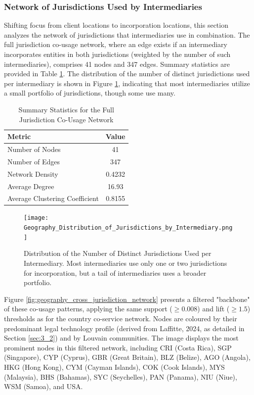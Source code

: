 \subsubsection{Network of Jurisdictions Used by Intermediaries}
\label{subsubsec:network_jurisdictions_used}

Shifting focus from client locations to incorporation locations, this section analyzes the network of jurisdictions that intermediaries use in combination. The full jurisdiction co-usage network, where an edge exists if an intermediary incorporates entities in both jurisdictions (weighted by the number of such intermediaries), comprises 41 nodes and 347 edges. Summary statistics are provided in Table \ref{tab:jurisdiction_network_summary}. The distribution of the number of distinct jurisdictions used per intermediary is shown in Figure \ref{fig:geography_distribution_jurisdictions_by_intermediary}, indicating that most intermediaries utilize a small portfolio of jurisdictions, though some use many.

\begin{table}[htbp]
\centering
\caption{Summary Statistics for the Full Jurisdiction Co-Usage Network}
\label{tab:jurisdiction_network_summary}
\begin{tabular}{lc}
\toprule
\textbf{Metric}                        & \textbf{Value}    \\
\midrule
Number of Nodes               & 41       \\
Number of Edges               & 347      \\
Network Density               & 0.4232   \\
Average Degree                & 16.93    \\
Average Clustering Coefficient & 0.8155   \\
\bottomrule
\end{tabular}
\end{table}

\begin{figure}[htbp]
    \centering
    \texttt{[image: Geography\_Distribution\_of\_Jurisdictions\_by\_Intermediary.png]}
    \caption{Distribution of the Number of Distinct Jurisdictions Used per Intermediary. Most intermediaries use only one or two jurisdictions for incorporation, but a tail of intermediaries uses a broader portfolio.}
    \label{fig:geography_distribution_jurisdictions_by_intermediary}
\end{figure}

Figure \ref{fig:geography_cross_jurisdiction_network} presents a filtered "backbone" of these co-usage patterns, applying the same support ($\ge 0.008$) and lift ($\ge 1.5$) thresholds as for the country co-service network. Nodes are coloured by their predominant legal technology profile (derived from Laffitte, 2024, as detailed in Section \ref{sec:3_2}) and by Louvain communities. The image displays the most prominent nodes in this filtered network, including CRI (Costa Rica), SGP (Singapore), CYP (Cyprus), GBR (Great Britain), BLZ (Belize), AGO (Angola), HKG (Hong Kong), CYM (Cayman Islands), COK (Cook Islands), MYS (Malaysia), BHS (Bahamas), SYC (Seychelles), PAN (Panama), NIU (Niue), WSM (Samoa), and USA.


